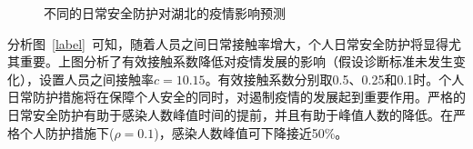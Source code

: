 \documentclass{whutmod}
\begin{document}
        \begin{figure}[H]
        	\centering
        	\caption{不同的日常安全防护对湖北的疫情影响预测}
        \end{figure}
        
        分析图~\ref{label}~可知，随着人员之间日常接触率增大，个人日常安全防护将显得尤其重要。上图分析了有效接触系数降低对疫情发展的影响（假设诊断标准未发生变化），设置人员之间接触率$c=10.15$。有效接触系数分别取0.5、0.25和0.1时。个人日常防护措施将在保障个人安全的同时，对遏制疫情的发展起到重要作用。严格的日常安全防护有助于感染人数峰值时间的提前，并且有助于峰值人数的降低。在严格个人防护措施下($\rho=0.1$)，感染人数峰值可下降接近50\%。
        
\end{document}
